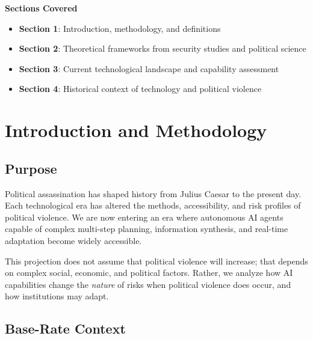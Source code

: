 \documentclass[11pt,letterpaper]{article}
\begin{document}
\begin{center}
\begin{minipage}{0.9\textwidth}
\begin{tcolorbox}[enhanced, colback=white, colframe=instblue!30, boxrule=1pt, arc=4pt,
  left=15pt, right=15pt, top=12pt, bottom=12pt]
\textcolor{instdark}{\textbf{Sections Covered}}
\vspace{0.4em}
\begin{itemize}[nosep]
  \item \textbf{Section 1}: Introduction, methodology, and definitions
  \item \textbf{Section 2}: Theoretical frameworks from security studies and political science
  \item \textbf{Section 3}: Current technological landscape and capability assessment
  \item \textbf{Section 4}: Historical context of technology and political violence
\end{itemize}
\end{tcolorbox}
\end{minipage}
\end{center}

\vspace{0.8cm}

\section{Introduction and Methodology}

\subsection{Purpose}

Political assassination has shaped history from Julius Caesar to the present day. Each technological era has altered the methods, accessibility, and risk profiles of political violence. We are now entering an era where autonomous AI agents capable of complex multi-step planning, information synthesis, and real-time adaptation become widely accessible.

This projection does not assume that political violence will increase; that depends on complex social, economic, and political factors. Rather, we analyze how AI capabilities change the \textit{nature} of risks when political violence does occur, and how institutions may adapt.

\subsection{Base-Rate Context}
\end{document}
